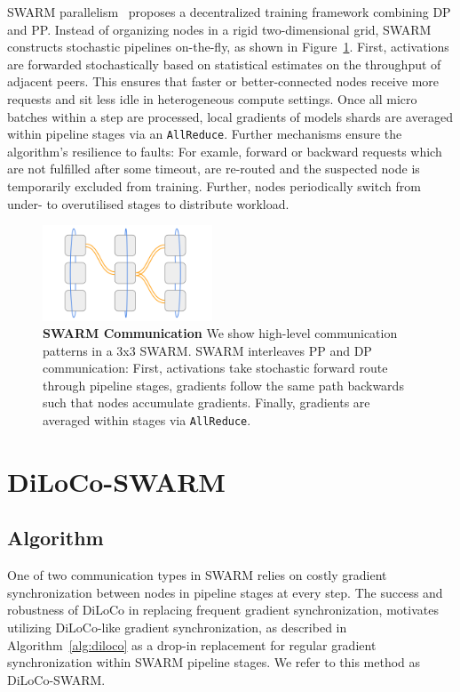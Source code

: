 \documentclass{article}
\begin{document}
SWARM parallelism~\cite{ryabinin2023swarm} proposes a decentralized training
framework combining DP and PP. Instead of organizing nodes in a rigid
two-dimensional grid, SWARM constructs stochastic pipelines on-the-fly, as shown
in Figure~\ref{fig:swarm}. First, activations are forwarded stochastically based
on statistical estimates on the throughput of adjacent peers. This ensures that
faster or better-connected nodes receive more requests and sit less idle in
heterogeneous compute settings. Once all micro batches within a step are
processed, local gradients of models shards are averaged within pipeline stages
via an \texttt{AllReduce}. Further mechanisms ensure the algorithm's resilience
to faults: For examle, forward or backward requests which are not fulfilled
after some timeout, are re-routed and the suspected node is temporarily excluded
from training. Further, nodes periodically switch from under- to overutilised
stages to distribute workload.

\begin{figure}[ht]
  \centering
  \includegraphics[width=0.45\textwidth]{figures/swarm.png}
  \caption{\textbf{SWARM Communication} We show high-level communication
  patterns in a 3x3 SWARM. SWARM interleaves PP and DP communication: First,
  activations take stochastic forward route through pipeline stages, gradients
  follow the same path backwards such that nodes accumulate gradients. Finally,
  gradients are averaged within stages via \texttt{AllReduce}.}
  \label{fig:swarm}
\end{figure}


\section{DiLoCo-SWARM}

\subsection{Algorithm}

One of two communication types in SWARM relies on costly gradient
synchronization between nodes in pipeline stages at every step. The success and
robustness of DiLoCo in replacing frequent gradient synchronization, motivates 
utilizing DiLoCo-like gradient synchronization, as described in
Algorithm~\ref{alg:diloco} as a drop-in replacement for regular gradient
synchronization within SWARM pipeline stages. We refer to this method as
DiLoCo-SWARM.
\end{document}
